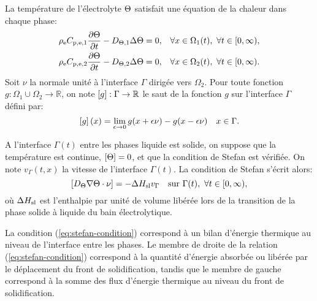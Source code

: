La température de l'électrolyte $\Theta$ satisfait une équation
de la chaleur dans chaque phase:
\begin{align}
  &\rho_\mathrm{e}C_{\mathrm{p,e,1}} \frac{\partial
    \Theta}{\partial t} - D_{\Theta,\mathrm{1}} \Delta\Theta
  = 0, & \forall x \in \Omega_1(t),\ \forall t\in [0,\infty),\label{eq:heat-solid-phase}\\
    &\rho_\mathrm{e}C_{\mathrm{p,e,2}} \frac{\partial
    \Theta}{\partial t} - D_{\Theta,\mathrm{2}} \Delta\Theta
  = 0, & \forall x \in \Omega_2(t),\ \forall t\in [0,\infty).\label{eq:heat-liquid-phase}
\end{align}
Soit $\nu$ la normale unité à l'interface $\Gamma$ dirigée vers
$\Omega_2$. Pour toute fonction $g:\Omega_1\cup\Omega_2\to\mathbb R$,
on note $\left[ g \right]:\Gamma\to\mathbb R$ le saut de la fonction $g$ sur
l'interface $\Gamma$ défini par:
\begin{equation}
  \left[ g \right](x) = \lim_{\epsilon\to 0}g(x + \epsilon\nu) - g(x -
  \epsilon\nu) \quad x\in \Gamma.
\end{equation}

A l'interface $\Gamma(t)$ entre les phases liquide est solide, on
suppose que la température est continue, $\left[ \Theta \right] = 0$, et
que la condition de Stefan est vérifiée. On note $v_\Gamma(t, x)$ la
vitesse de l'interface $\Gamma(t)$. La condition de Stefan s'écrit
alors:
\begin{equation}
  \jump{\electrolytetdiff\nabla\temperature \cdot \nu} %
  = - \fusionenthalpy v_\Gamma\quad\text{sur }\Gamma(t),\ \forall t\in[0,\infty),
  \label{eq:stefan-condition}
\end{equation}
où $\Delta H_\mathrm{sl}$ est l'enthalpie par unité de volume
libérée lors de la transition de la phase solide à liquide du
bain électrolytique.

La condition (\ref{eq:stefan-condition}) correspond à un bilan
d'énergie thermique au niveau de l'interface entre les phases. Le
membre de droite de la relation (\ref{eq:stefan-condition}) correspond
à la quantité d'énergie absorbée ou libérée par le déplacement du
front de solidification, tandis que le membre de gauche correspond à
la somme des flux d'énergie thermique au niveau du front de
solidification.

